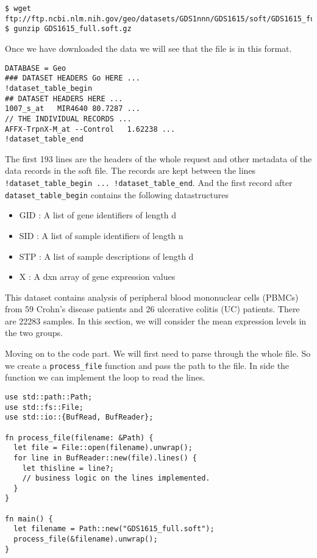 \documentclass{book}
\begin{document}
\begin{lstlisting}[caption={}, basicstyle=\small]
$ wget ftp://ftp.ncbi.nlm.nih.gov/geo/datasets/GDS1nnn/GDS1615/soft/GDS1615_full.soft.gz
$ gunzip GDS1615_full.soft.gz
\end{lstlisting}

Once we have downloaded the data we will see that the file is in this format.

\begin{lstlisting}[caption={}]
DATABASE = Geo
### DATASET HEADERS Go HERE ...
!dataset_table_begin
## DATASET HEADERS HERE ...
1007_s_at	MIR4640	80.7287	...
// THE INDIVIDUAL RECORDS ...
AFFX-TrpnX-M_at	--Control	1.62238	...
!dataset_table_end
\end{lstlisting}

The first 193 lines are the headers of the whole request and other metadata of the data records in the soft file. The records are kept between the lines \lstinline{!dataset_table_begin ... !dataset_table_end}. And the first record after \lstinline{dataset_table_begin} contains the following datastructures

\begin{itemize}
	\item GID : A list of gene identifiers of length d 
	\item SID : A list of sample identifiers of length n
	\item STP : A list of sample descriptions of length d
	\item X : A dxn array of gene expression values
\end{itemize}

This dataset contains analysis of peripheral blood mononuclear cells (PBMCs) from 59 Crohn's disease patients and 26 ulcerative colitis (UC) patients. There are 22283 samples. In this section, we will consider the mean expression levels in the two groups.

Moving on to the code part. We will first need to parse through the whole file. So we create a \lstinline{process_file} function and pass the path to the file. In side the function we can implement the loop to read the lines.

\begin{lstlisting}[caption={chapter7/statistics/src/main.rs}, basicstyle=\small]
use std::path::Path;
use std::fs::File;
use std::io::{BufRead, BufReader};

fn process_file(filename: &Path) {
  let file = File::open(filename).unwrap();
  for line in BufReader::new(file).lines() {
    let thisline = line?;
    // business logic on the lines implemented.
  }
}

fn main() {
  let filename = Path::new("GDS1615_full.soft");
  process_file(&filename).unwrap();
}
\end{lstlisting}
\end{document}
